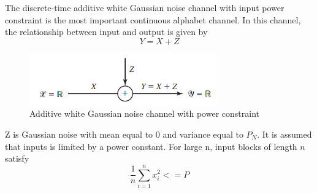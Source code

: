 \documentclass[a4paper, 13pt]{report}
\begin{document}
\par The discrete-time additive white Gaussian noise channel with input power constraint is the most important continuous alphabet channel. In this channel, the relationship between input and output is given by
\begin{equation}
    Y=X+Z
\end{equation}
\begin{figure}[H]  %
    \centering
    \includegraphics[width=0.4\linewidth]{./AWG.PNG}
    \caption{Additive white Gaussian noise channel with power constraint}
    \label{fig:awg}
\end{figure}
\par Z is Gaussian noise with mean equal to 0 and variance equal to $P_N$. It is assumed that inputs is limited by a power constant. For large n, input blocks of length $n$ satisfy
\begin{equation}
    \frac{1}{n}\sum_{i=1}^{n}x_i^2 <= P
\end{equation}
\end{document}
